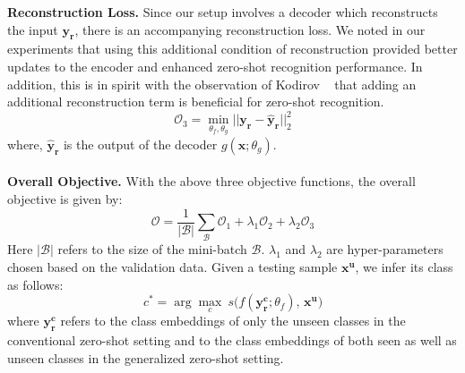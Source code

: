 \documentclass[10pt,twocolumn,letterpaper]{article}
\begin{document}
\textbf{Reconstruction Loss.}
Since our setup involves a decoder which reconstructs the input $\mathbf{y_r}$, there is an accompanying reconstruction loss. We noted in our experiments that using this additional condition of reconstruction provided better updates to the encoder and enhanced zero-shot recognition performance. In addition, this is in spirit with the observation of Kodirov \etal~\cite{Kodirov_2017_CVPR} that adding an additional reconstruction term is beneficial for zero-shot recognition. 
\begin{equation}
\label{recons}
\mathcal{O}_3 = \min_{\theta_f, \theta_g} ||\mathbf{y_r} - \mathbf{\hat y_r}||_2^2
\end{equation} 
where, $\mathbf{\hat y_r}$ is the output of the decoder $g(\mathbf{x}; \theta_g)$.\\\\
\textbf{Overall Objective.}
With the above three objective functions, the overall objective is given by:
\begin{equation}
\mathcal{O}  = \dfrac{1}{|\mathcal{B}|}\sum_{\mathcal{B}}\mathcal{O}_1 + \lambda_1\mathcal{O}_2 + \lambda_2\mathcal{O}_3 
\end{equation}
Here $|\mathcal{B}|$ refers to the size of the mini-batch $\mathcal{B}$. $\lambda_1$ and $\lambda_2$ are hyper-parameters chosen based on the validation data. 
Given a testing sample $\mathbf{x^u}$, we infer its class as follows:
\begin{equation}
c^* = \arg\max_c \ s\big(f(\mathbf{y_r^c};\theta_f),\, \mathbf{x^u}\big)
\end{equation}
where $\mathbf{y_r^c}$ refers to the class embeddings of only the unseen classes in the conventional zero-shot setting and to the class embeddings of both seen as well as unseen classes in the generalized zero-shot setting.
\end{document}
